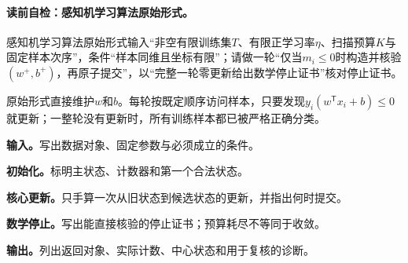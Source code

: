 \paragraph{读前自检：感知机学习算法原始形式。}感知机学习算法原始形式输入“非空有限训练集$T$、有限正学习率$\eta$、扫描预算$K$与固定样本次序”，条件“样本同维且坐标有限”；请做一轮“仅当$m_i\le0$时构造并核验$(w^+,b^+)$，再原子提交”，以“完整一轮零更新给出数学停止证书”核对停止证书。\par

\label{struct:V2-C01-CH10}
原始形式直接维护$w$和$b$。每轮按既定顺序访问样本，只要发现$y_i(w^{\mathsf T}x_i+b)\le0$就更新；一整轮没有更新时，所有训练样本都已被严格正确分类。

\label{struct:V2-C01-CH19}
\label{struct:V2-C01-CH20}
\label{struct:V2-C01-CH21}
\label{struct:V2-C01-CH22}
\label{struct:V2-C01-CH23}
\label{struct:V2-C01-CH24}
\label{struct:V2-C01-CH25}
\begin{keypointbox}[title={感知机学习算法的原始形式：五步阅读}]
\textbf{输入。}写出数据对象、固定参数与必须成立的条件。\par
\textbf{初始化。}标明主状态、计数器和第一个合法状态。\par
\textbf{核心更新。}只手算一次从旧状态到候选状态的更新，并指出何时提交。\par
\textbf{数学停止。}写出能直接核验的停止证书；预算耗尽不等同于收敛。\par
\textbf{输出。}列出返回对象、实际计数、中心状态和用于复核的诊断。
\end{keypointbox}

